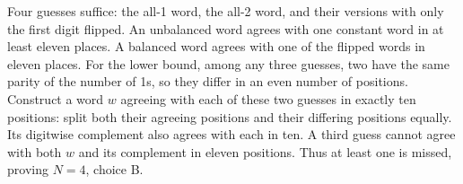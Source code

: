 Four guesses suffice: the all-1 word, the all-2 word, and their versions with only the first digit flipped. An unbalanced word agrees with one constant word in at least eleven places. A balanced word agrees with one of the flipped words in eleven places. For the lower bound, among any three guesses, two have the same parity of the number of 1s, so they differ in an even number of positions. Construct a word $w$ agreeing with each of these two guesses in exactly ten positions: split both their agreeing positions and their differing positions equally. Its digitwise complement also agrees with each in ten. A third guess cannot agree with both $w$ and its complement in eleven positions. Thus at least one is missed, proving $\boxed{N=4}$, choice B.
